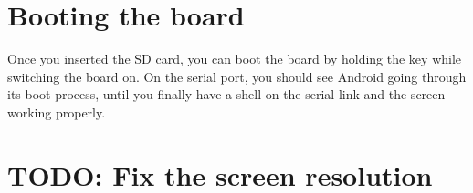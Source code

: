 \section{Booting the board}

Once you inserted the SD card, you can boot the board by holding the
 key while switching the board on. On the serial port, you
should see Android going through its boot process, until you finally
have a shell on the serial link and the screen working properly.

\section{TODO: Fix the screen resolution}
